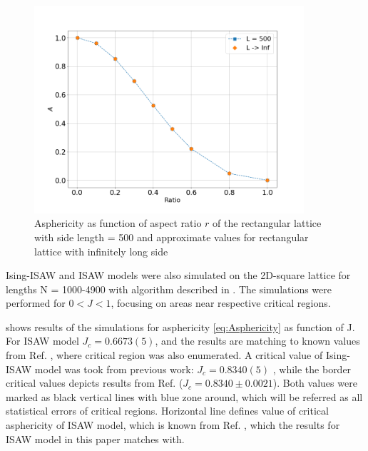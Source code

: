 \begin{figure}[h]
    \centering
    \includegraphics[width=100mm]{Images/A_r.png}
    \caption{Asphericity as function of aspect ratio $r$ of the rectangular lattice with side length = 500 and approximate values for rectangular lattice with infinitely long side}
    \label{fig:A_r}
\end{figure}


Ising-ISAW and ISAW models were also simulated on the 2D-square lattice for lengths N = 1000-4900 with algorithm described in \cite{faizullina2021critical}. 
The simulations were performed for $0 < J < 1$, focusing on areas near respective critical regions.

 shows results of the simulations for asphericity \eqref{eq:Asphericity} as function of J. 
For ISAW model $J_{c} = 0.6673(5)$, and the results are matching to known values from  Ref. \cite{Caracciolo2011}, where critical region was also enumerated.
A critical value of Ising-ISAW model was took from previous work: $J_{c} = 0.8340(5)$ \cite{faizullina2021critical}, while the border critical values depicts results from Ref.\cite{Foster2021} ($J_{c} = 0.8340 \pm 0.0021$). 
Both values were marked as black vertical lines with blue zone around, which will be referred as all statistical errors of critical regions. 
Horizontal line defines value of critical asphericity of ISAW model, which is known from Ref. \cite{Caracciolo2011}, which the results for ISAW model in this paper matches with.

